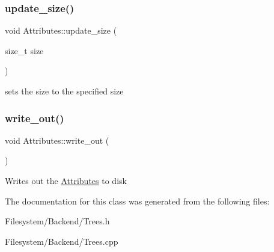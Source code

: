 \subsubsection{\texorpdfstring{update\+\_\+size()}{update\_size()}}
{\footnotesize\ttfamily void Attributes\+::update\+\_\+size (\begin{DoxyParamCaption}\item[{size\+\_\+t}]{size }\end{DoxyParamCaption})}

sets the size to the specified size \mbox{\label{classAttributes_a7066f30d97317f75a02a137d09a2065e}} 
\subsubsection{\texorpdfstring{write\+\_\+out()}{write\_out()}}
{\footnotesize\ttfamily void Attributes\+::write\+\_\+out (\begin{DoxyParamCaption}{ }\end{DoxyParamCaption})}

Writes out the \mbox{\hyperlink{classAttributes}{Attributes}} to disk 

The documentation for this class was generated from the following files\+:\begin{DoxyCompactItemize}
\item 
Filesystem/\+Backend/Trees.\+h\item 
Filesystem/\+Backend/Trees.\+cpp\end{DoxyCompactItemize}
